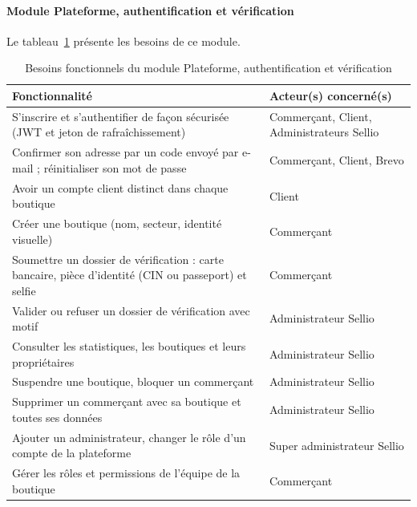 \paragraph{Module Plateforme, authentification et vérification}
Le tableau~\ref{tab:besoins-plateforme} présente les besoins de ce module.
\begin{table}[H]
\centering
\renewcommand{\arraystretch}{1.3}
\begin{tabular}{|p{9.5cm}|p{5.5cm}|}
\hline
\textbf{Fonctionnalité} & \textbf{Acteur(s) concerné(s)} \\
\hline
S'inscrire et s'authentifier de façon sécurisée (JWT et jeton de rafraîchissement) & Commerçant, Client, Administrateurs Sellio \\
\hline
Confirmer son adresse par un code envoyé par e-mail ; réinitialiser son mot de passe & Commerçant, Client, Brevo \\
\hline
Avoir un compte client distinct dans chaque boutique & Client \\
\hline
Créer une boutique (nom, secteur, identité visuelle) & Commerçant \\
\hline
Soumettre un dossier de vérification : carte bancaire, pièce d'identité (CIN ou passeport) et selfie & Commerçant \\
\hline
Valider ou refuser un dossier de vérification avec motif & Administrateur Sellio \\
\hline
Consulter les statistiques, les boutiques et leurs propriétaires & Administrateur Sellio \\
\hline
Suspendre une boutique, bloquer un commerçant & Administrateur Sellio \\
\hline
Supprimer un commerçant avec sa boutique et toutes ses données & Administrateur Sellio \\
\hline
Ajouter un administrateur, changer le rôle d'un compte de la plateforme & Super administrateur Sellio \\
\hline
Gérer les rôles et permissions de l'équipe de la boutique & Commerçant \\
\hline
\end{tabular}
\caption{Besoins fonctionnels du module Plateforme, authentification et vérification}
\label{tab:besoins-plateforme}
\end{table}

